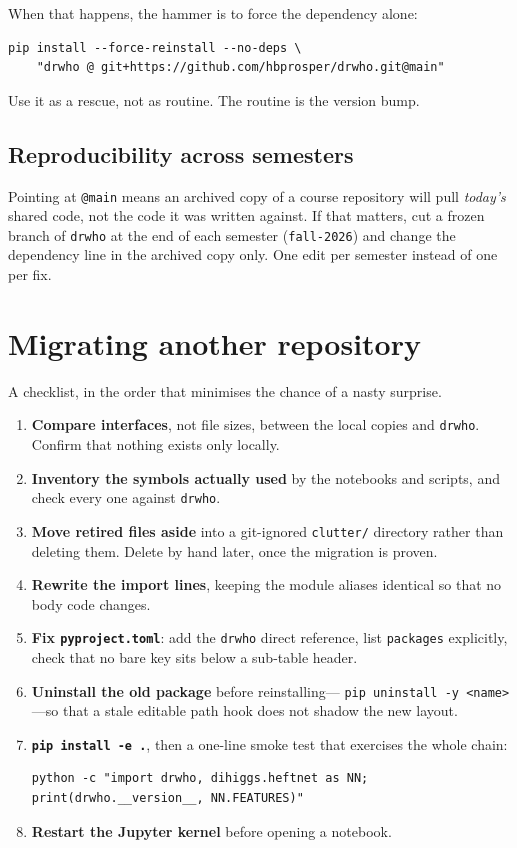 \documentclass[11pt,a4paper]{article}
\newcommand{\pkg}[1]{\texttt{#1}}
\begin{document}
When that happens, the hammer is to force the dependency alone:

\begin{lstlisting}[style=sh]
pip install --force-reinstall --no-deps \
    "drwho @ git+https://github.com/hbprosper/drwho.git@main"
\end{lstlisting}

Use it as a rescue, not as routine. The routine is the version bump.

\subsection{Reproducibility across semesters}

Pointing at \texttt{@main} means an archived copy of a course repository will
pull \emph{today's} shared code, not the code it was written against. If that
matters, cut a frozen branch of \pkg{drwho} at the end of each semester
(\texttt{fall-2026}) and change the dependency line in the archived copy only.
One edit per semester instead of one per fix.

\section{Migrating another repository}

A checklist, in the order that minimises the chance of a nasty surprise.

\begin{enumerate}
\item \textbf{Compare interfaces}, not file sizes, between the local copies and
      \pkg{drwho}. Confirm that nothing exists only locally.
\item \textbf{Inventory the symbols actually used} by the notebooks and scripts,
      and check every one against \pkg{drwho}.
\item \textbf{Move retired files aside} into a git-ignored \texttt{clutter/}
      directory rather than deleting them. Delete by hand later, once the
      migration is proven.
\item \textbf{Rewrite the import lines}, keeping the module aliases identical so
      that no body code changes.
\item \textbf{Fix \texttt{pyproject.toml}}: add the \pkg{drwho} direct
      reference, list \texttt{packages} explicitly, check that no bare key sits
      below a sub-table header.
\item \textbf{Uninstall the old package} before reinstalling---
      \texttt{pip uninstall -y <name>}---so that a stale editable path hook does
      not shadow the new layout.
\item \textbf{\texttt{pip install -e .}}, then a one-line smoke test that
      exercises the whole chain:
\begin{lstlisting}[style=sh]
python -c "import drwho, dihiggs.heftnet as NN; print(drwho.__version__, NN.FEATURES)"
\end{lstlisting}
\item \textbf{Restart the Jupyter kernel} before opening a notebook.
\end{enumerate}
\end{document}
